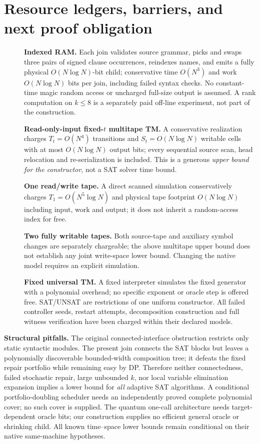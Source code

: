 \documentclass[10pt]{article}
\begin{document}
\section{Resource ledgers, barriers, and next proof obligation}
\begin{description}
\item[] \textbf{Indexed RAM.} Each join validates source grammar, picks and swaps three pairs of signed clause occurrences, reindexes names, and emits a fully physical $O(N\log N)$-bit child; conservative time $O(N^3)$ and work $O(N\log N)$ bits per join, including failed syntax checks. No constant-time magic random access or uncharged full-size output is assumed. A rank computation on $k\le8$ is a separately paid off-line experiment, not part of the construction.
\item[] \textbf{Read-only-input fixed-$t$ multitape TM.} A conservative realization charges $T_t=O(N^4)$ transitions and $S_t=O(N\log N)$ writable cells with at most $O(N\log N)$ output bits; every sequential source scan, head relocation and re-serialization is included. This is a generous \emph{upper bound for the constructor}, not a SAT solver time bound.
\item[] \textbf{One read/write tape.} A direct scanned simulation conservatively charges $T_1=O(N^5\log N)$ and physical tape footprint $O(N\log N)$ including input, work and output; it does not inherit a random-access index for free.
\item[] \textbf{Two fully writable tapes.} Both source-tape and auxiliary symbol changes are separately chargeable; the above multitape upper bound does not establish any joint write-space lower bound. Changing the native model requires an explicit simulation.
\item[] \textbf{Fixed universal TM.} A fixed interpreter simulates the fixed generator with a polynomial overhead; no specific exponent or oracle step is offered free. SAT/UNSAT are restrictions of one uniform constructor. All failed controller seeds, restart attempts, decomposition construction and full witness verification have been charged within their declared models.
\end{description}
\noindent\textbf{Structural pitfalls.} The original connected-interface obstruction restricts only static syntactic modules. The present join connects the SAT blocks but leaves a polynomially discoverable bounded-width composition tree; it defeats the fixed repair portfolio while remaining easy by DP. Therefore neither connectedness, failed stochastic repair, large unbounded $k$, nor local variable elimination expansion implies a lower bound for \emph{all} adaptive SAT algorithms. A conditional portfolio-doubling scheduler needs an independently proved complete polynomial cover; no such cover is supplied. The quantum one-call architecture needs target-dependent oracle bits; our construction supplies no efficient general oracle or shrinking child. All known time--space lower bounds remain conditional on their native same-machine hypotheses.
\end{document}
